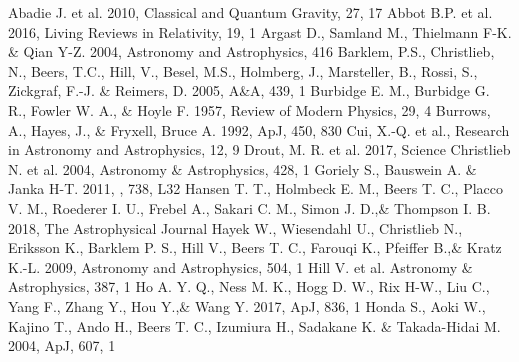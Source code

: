 \documentclass[a4paper,fleqn,usenatbib]{mnras}
\begin{document}
	
	\begin{thebibliography}{99}
		Abadie J. et al. 2010, Classical and Quantum Gravity, 27, 17
		Abbot B.P. et al. 2016, Living Reviews in Relativity, 19, 1
		Argast D., Samland M., Thielmann F-K. \& Qian Y-Z. 2004, Astronomy and Astrophysics, 416
		Barklem, P.S., Christlieb, N., Beers, T.C., Hill, V., Besel, M.S., Holmberg, J., Marsteller, B., Rossi, S., Zickgraf, F.-J. \& Reimers, D. 2005, A\&A, 439, 1
		Burbidge E. M., Burbidge G. R., Fowler W. A., \& Hoyle F. 1957, Review of Modern Physics, 29, 4
		Burrows, A., Hayes, J., \& Fryxell, Bruce A. 1992, ApJ, 450, 830
		Cui, X.-Q. et al., Research in Astronomy and Astrophysics, 12, 9
		Drout, M. R. et al. 2017, Science
		Christlieb N. et al. 2004, Astronomy \& Astrophysics, 428, 1
		Goriely S., Bauswein A. \& Janka H-T. 2011, , 738, L32
		Hansen T. T., Holmbeck E. M., Beers T. C., Placco V. M., Roederer I. U., Frebel A., Sakari C. M., Simon J. D.,\& Thompson I. B. 2018, The Astrophysical Journal
		Hayek W., Wiesendahl U., Christlieb N., Eriksson K., Barklem P. S., Hill V., Beers T. C., Farouqi K., Pfeiffer B.,\& Kratz K.-L. 2009, Astronomy and Astrophysics, 504, 1
		Hill V. et al. Astronomy \& Astrophysics, 387, 1
		Ho A. Y. Q., Ness M. K., Hogg D. W., Rix H-W., Liu C., Yang F., Zhang Y., Hou Y.,\& Wang Y. 2017, ApJ, 836, 1
		Honda S., Aoki W., Kajino T., Ando H., Beers T. C., Izumiura H., Sadakane K. \& Takada-Hidai M. 2004, ApJ, 607, 1

\end{thebibliography}
\end{document}
